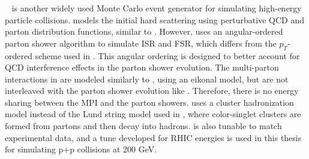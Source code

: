 \subsubsection{\herwig}
\herwig~\cite{herwig7,herwig7_tune} is another widely used Monte Carlo event generator for simulating high-energy particle collisions. 
\herwig models the initial hard scattering using perturbative QCD and parton distribution functions, similar to \pythia.
However, \herwig uses an angular-ordered parton shower algorithm to simulate ISR and FSR, which differs from the $p_{T}$-ordered scheme used in \pythia. 
This angular ordering is designed to better account for QCD interference effects in the parton shower evolution. 
The multi-parton interactions in \herwig are modeled similarly to \pythia, using an eikonal model, but are not interleaved with the parton shower evolution like \pythia.
Therefore, there is no energy sharing between the MPI and the parton showers.
\herwig uses a cluster hadronization model instead of the Lund string model used in \pythia, where color-singlet clusters are formed from partons and then decay into hadrons.
\herwig is also tunable to match experimental data, and a tune developed for RHIC energies is used in this thesis for simulating p+p collisions at 200 GeV.